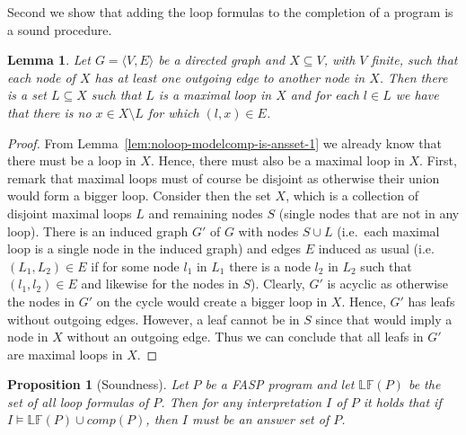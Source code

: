 \documentclass{tlp}
\newcommand{\comp}[1]{\ensuremath{comp(#1)}}
\newcommand{\loopformprog}[1]{\mathbb{LF}(#1)}
\newcommand{\tuple}[1]{\ensuremath{\langle{#1}\rangle}}
\newtheorem{proposition}{Proposition}
\newtheorem{lemma}{Lemma}
\begin{document}
Second we show that adding the loop formulas to the completion of a program is a sound procedure.


\begin{lemma}\label{lem:loopforms-sound-1}
 Let $G = \tuple{V,E}$ be a directed graph and $X \subseteq V$, with $V$ finite, such that each node of $X$ has at least one outgoing edge to another node in $X$. Then there is a set $L \subseteq X$ such that $L$ is a maximal loop in $X$ and for each $l \in L$ we have that there is no $x \in X \setminus L$ for which $(l,x) \in E$.
\end{lemma}
\begin{proof}
 From Lemma~\ref{lem:noloop-modelcomp-is-ansset-1} we already know that there must be a loop in $X$. Hence, there must also be a maximal loop in $X$. First, remark that maximal loops must of course be disjoint as otherwise their union would form a bigger loop.
 Consider then the set $X$, which is a collection of disjoint maximal loops $L$ and remaining nodes $S$ (single nodes that are not in any loop). There is an induced graph $G'$ of $G$ with nodes $S \cup L$ (i.e.~each maximal loop is a single node in the induced graph) and edges $E$ induced as usual (i.e.~$(L_1,L_2) \in E$ if for some node $l_1$ in $L_1$ there is a node $l_2$ in $L_2$ such that $(l_1,l_2) \in E$ and likewise for the nodes in $S$). Clearly, $G'$ is acyclic as otherwise the nodes in $G'$ on the cycle would create a bigger loop in $X$. Hence, $G'$ has leafs without outgoing edges. However, a leaf cannot be in $S$ since that would imply a node in $X$ without an outgoing edge. Thus we can conclude that all leafs in $G'$ are maximal loops in $X$.
\end{proof}







\begin{proposition}[Soundness]\label{prop:loopforms-sound}
 Let $P$ be a FASP program and let $\loopformprog{P}$ be the set of all loop formulas of $P$. Then for any interpretation $I$ of $P$ it holds that if $I \models \loopformprog{P} \cup \comp{P}$, then $I$ must be an answer set of $P$.
\end{proposition}
\end{document}

